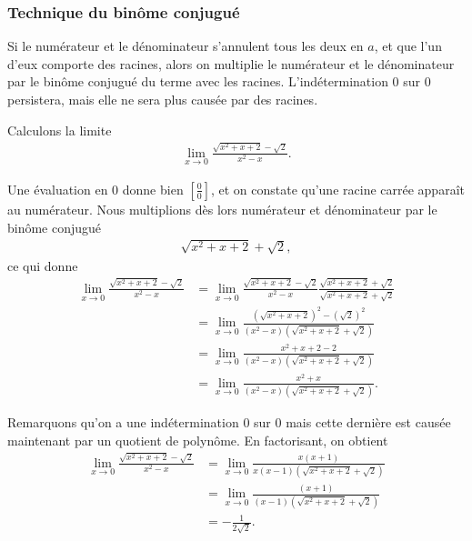 \documentclass[main.tex]{subfiles}
\begin{document}
\subsubsection{Technique du binôme conjugué}

Si le numérateur et le dénominateur s'annulent tous les deux en $a$,
et que l'un d'eux comporte des racines,
alors on multiplie le numérateur et le dénominateur par le binôme conjugué du terme avec les racines.
L'indétermination $0$ sur $0$ persistera,
mais elle ne sera plus causée par des racines.

\begin{example}

    Calculons la limite
    \begin{align}
        \lim_{x \to 0} \frac {\sqrt{x^2 + x + 2} - \sqrt{2}} {x^2 - x}.
    \end{align}

    Une évaluation en $0$ donne bien $[\frac 0 0]$,
    et on constate qu'une racine carrée apparaît au numérateur.
    Nous multiplions dès lors numérateur et dénominateur par le binôme conjugué
    \begin{align}
        \sqrt {x^2 + x + 2} + \sqrt 2,
    \end{align}
    ce qui donne
    \begin{align}
        \lim_{x \to 0} \frac {\sqrt{x^2 + x + 2} - \sqrt{2}} {x^2 - x}
        &= \lim_{x \to 0} \frac {\sqrt{x^2 + x + 2} - \sqrt{2}} {x^2 - x} \frac {\sqrt {x^2 + x + 2} + \sqrt 2} {\sqrt {x^2 + x + 2} + \sqrt 2}\\
        &= \lim_{x \to 0} \frac {(\sqrt{x^2 + x + 2})^2 -(\sqrt{2})^2} {(x^2 - x)(\sqrt {x^2 + x + 2} + \sqrt 2)}\\
        &= \lim_{x \to 0} \frac {x^2 + x +2 - 2} {(x^2 - x)(\sqrt {x^2 + x + 2} + \sqrt 2)}\\
        &= \lim_{x \to 0} \frac {x^2 + x} {(x^2 - x)(\sqrt {x^2 + x + 2} + \sqrt 2)}.
    \end{align}

    Remarquons qu'on a une indétermination $0$ sur $0$
    mais cette dernière est causée maintenant par un quotient de polynôme.
    En factorisant, on obtient
    \begin{align}
        \lim_{x \to 0} \frac {\sqrt{x^2 + x + 2} - \sqrt{2}} {x^2 - x}
        &= \lim_{x \to 0} \frac {x(x + 1)} {x(x - 1)(\sqrt {x^2 + x + 2} + \sqrt 2)}\\
        &= \lim_{x \to 0} \frac {(x + 1)} {(x - 1)(\sqrt {x^2 + x + 2} + \sqrt 2)}\\
        &= -\frac 1 {2 \sqrt 2}.
    \end{align}
\end{example}
\end{document}
